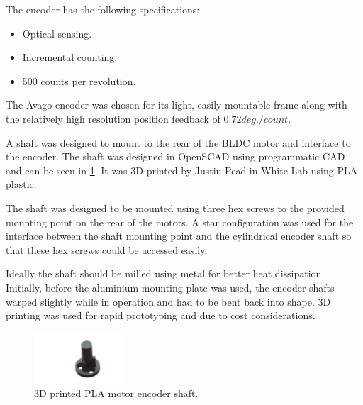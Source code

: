 The encoder has the following specifications:
\begin{itemize}
\item Optical sensing.
\item Incremental counting.
\item 500 counts per revolution.
\end{itemize}

The Avago encoder was chosen for its light, easily mountable frame along with the relatively high resolution position feedback of $0.72 deg./count$.
 
A shaft was designed to mount to the rear of the BLDC motor and interface to the encoder. The shaft was designed in OpenSCAD using programmatic CAD and can be seen in \cref{fig:encoder-shaft}. It was 3D printed by Justin Pead in White Lab using PLA plastic. 

The shaft was designed to be mounted using three hex screws to the provided mounting point on the rear of the motors. A star configuration was used for the interface between the shaft mounting point and the cylindrical encoder shaft so that these hex screws could be accessed easily.

Ideally the shaft should be milled using metal for better heat dissipation. Initially, before the aluminium mounting plate was used, the encoder shafts warped slightly while in operation and had to be bent back into shape. 3D printing was used for rapid prototyping and due to cost considerations.

\begin{figure}
\centering
\includegraphics[clip, trim = 6cm 1cm 3cm 1cm, width=0.3\textwidth]{images/mechanical/encoder-shaft} 
\caption{3D printed PLA motor encoder shaft.}
\label{fig:encoder-shaft}
\end{figure} 
